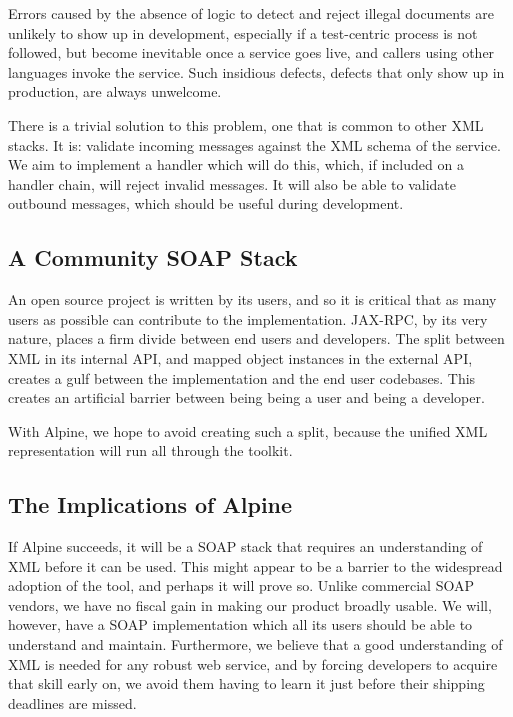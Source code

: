 Errors caused by the absence of logic to detect and reject illegal
documents are unlikely to show up in development, especially if a
test-centric process is not followed, but become inevitable once a
service goes live, and callers using other languages invoke the
service. Such insidious defects, defects that only show up in
production, are always unwelcome.

There is a trivial solution to this problem, one that is common to
other XML stacks. It is: validate incoming messages against the XML
schema of the service.  We aim to implement a handler which will do
this, which, if included on a handler chain, will reject invalid
messages. It will also be able to validate outbound messages, which
should be useful during development. 

\subsection{A Community SOAP Stack}
\label{alpine:community}


An open source project is written by its users, and so it
is critical that as many users as possible can contribute to
the implementation. JAX-RPC, by its very nature, places a firm divide
between end users and developers. The split between XML in its internal API, and
mapped object instances in the external API, creates
a gulf between the implementation and the end user codebases. This creates
an artificial barrier between being being a user and being a developer. 

With Alpine, we hope to avoid creating such a
split, because the unified XML representation will run all 
through the toolkit.


\subsection{The Implications of Alpine}
\label{alpine:implications}

If Alpine succeeds, it will be a SOAP stack that requires an
understanding of XML before it can be used. This might appear to be a
barrier to the widespread adoption of the tool, and perhaps it will
prove so. Unlike commercial SOAP vendors, we have no fiscal gain in
making our product broadly usable. We will, however, have a SOAP
implementation which all its users should be able to understand and
maintain.  Furthermore, we believe that a good understanding of XML is
needed for any robust web service, and by forcing developers to
acquire that skill early on, we avoid them having to learn it just
before their shipping deadlines are missed.

